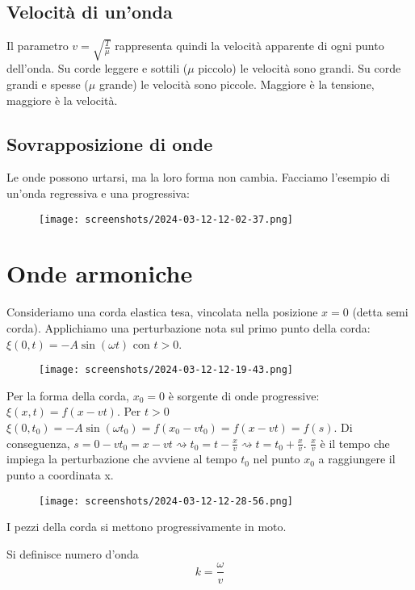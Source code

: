 \subsection{Velocità di un'onda}

Il parametro \(v = \sqrt{\frac{T}{\mu }} \) rappresenta quindi la velocità apparente di ogni punto dell'onda. Su corde leggere e sottili (\(\mu \) piccolo) le velocità sono grandi. Su corde grandi e spesse (\(\mu \) grande) le velocità sono piccole. Maggiore è la tensione, maggiore è la velocità.

\subsection{Sovrapposizione di onde}

Le onde possono urtarsi, ma la loro forma non cambia. Facciamo l'esempio di un'onda regressiva e una progressiva:
\begin{figure}[H]
	\centering
	\texttt{[image: screenshots/2024-03-12-12-02-37.png]}
\end{figure}

\section{Onde armoniche}

Consideriamo una corda elastica tesa, vincolata nella posizione \(x=0\) (detta semi corda). Applichiamo una perturbazione nota sul primo punto della corda: \(\xi (0,t) = -A \sin (\omega t)\) con \(t>0\). 
\begin{figure}[H]
	\centering
	\texttt{[image: screenshots/2024-03-12-12-19-43.png]}
\end{figure}
Per la forma della corda, \(x_0 = 0\) è sorgente di onde progressive: \(\xi (x,t) = f(x-vt)\). Per \(t>0\) \(\xi (0,t_0) = -A \sin (\omega t_0) = f(x_0 - vt_0) = f(x-vt) = f(s)\). Di conseguenza, \(s=0-vt_0=x-vt \rightsquigarrow t_0 = t-\frac{x}{v} \rightsquigarrow t= t_0 + \frac{x}{v}\). \(\frac{x}{v}\) è il tempo che impiega la perturbazione che avviene al tempo \(t_0\) nel punto \(x_0\) a raggiungere il punto a coordinata x.
\begin{figure}[H]
	\centering
	\texttt{[image: screenshots/2024-03-12-12-28-56.png]}
\end{figure}
I pezzi della corda si mettono progressivamente in moto.

\begin{definition}
	Si definisce numero d'onda
	\[
		k = \frac{\omega }{v}
	\]
\end{definition}

